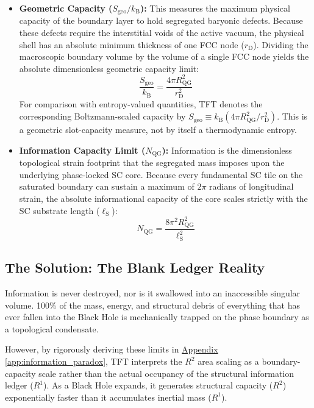 \begin{itemize}
    \item \textbf{Geometric Capacity ($S_{\mathrm{geo}}/k_{\mathrm{B}}$):} This measures the maximum physical capacity of the boundary layer to hold segregated baryonic defects. Because these defects require the interstitial voids of the active vacuum, the physical shell has an absolute minimum thickness of one FCC node ($r_{\mathrm{D}}$). Dividing the macroscopic boundary volume by the volume of a single FCC node yields the absolute dimensionless geometric capacity limit:
    \begin{equation}
        \frac{S_{\mathrm{geo}}}{k_{\mathrm{B}}} = \frac{4\pi R_{\mathrm{QG}}^2}{r_{\mathrm{D}}^2}
    \end{equation}
    For comparison with entropy-valued quantities, TFT denotes the corresponding Boltzmann-scaled capacity by $S_{\mathrm{geo}} \equiv k_{\mathrm{B}} (4\pi R_{\mathrm{QG}}^2 / r_{\mathrm{D}}^2)$. This is a geometric slot-capacity measure, not by itself a thermodynamic entropy.
    
    \item \textbf{Information Capacity Limit ($N_{\mathrm{QG}}$):} Information is the dimensionless topological strain footprint that the segregated mass imposes upon the underlying phase-locked SC core. Because every fundamental SC tile on the saturated boundary can sustain a maximum of $2\pi$ radians of longitudinal strain, the absolute informational capacity of the core scales strictly with the SC substrate length ($\ell_{\mathrm{S}}$):
    \begin{equation}
        N_{\mathrm{QG}} = \frac{8\pi^2 R_{\mathrm{QG}}^2}{\ell_{\mathrm{S}}^2}
    \end{equation}
\end{itemize}

\subsection{The Solution: The Blank Ledger Reality}

Information is never destroyed, nor is it swallowed into an inaccessible singular volume. 100\% of the mass, energy, and structural debris of everything that has ever fallen into the Black Hole is mechanically trapped on the phase boundary as a topological condensate.

However, by rigorously deriving these limits in \hyperref[app:information_paradox]{Appendix \ref*{app:information_paradox}}, TFT interprets the $R^2$ area scaling as a boundary-capacity scale rather than the actual occupancy of the structural information ledger ($R^1$). As a Black Hole expands, it generates structural capacity ($R^2$) exponentially faster than it accumulates inertial mass ($R^1$).

